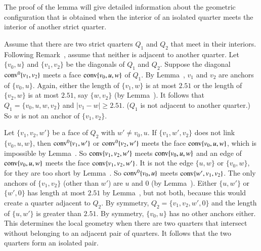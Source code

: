 \begin{tarskidata}
\begin{tarski}
The proof of the lemma will give detailed information about the
geometric configuration that is obtained when the interior of an
isolated quarter meets the interior of another strict quarter.

\begin{proved}  Assume that there are two strict quarters $Q_1$ and $Q_2$
that meet in their interiors.  Following Remark~,
assume that neither is adjacent to another quarter. Let $\{v_0,u\}$
and $\{v_1,v_2\}$ be the diagonals of $Q_1$ and $Q_2$. Suppose the
diagonal ${\operatorname{conv}}^0\{v_1,v_2\}$ meets a face ${\operatorname{conv}}\{v_0,u,w\}$ of $Q_1$.
By Lemma~, $v_1$ and $v_2$ are anchors of
$\{v_0,u\}$. Again, either the length of $\{v_1,w\}$ is at most
$2.51$ or the length of $\{v_2,w\}$ is at most $2.51$, say
$\{w,v_2\}$ (by Lemma~). It follows
that
    $Q_1=\{v_0,u,w,v_2\}$ and $|v_1-w|\ge2.51$.
($Q_1$ is not adjacent to another quarter.)  So $w$ is not an
anchor of $\{v_1,v_2\}$.

Let $\{v_1,v_2,w'\}$ be a face of $Q_2$ with $w'\ne v_0,u$. If
$\{v_1,w',v_2\}$ does not link $\{v_0,u,w\}$, then ${\operatorname{conv}}^0\{v_1,w'\}$ or
${\operatorname{conv}}^0\{v_2,w'\}$ meets the face ${\operatorname{conv}}\{v_0,u,w\}$, which is
impossible by Lemma~. So
${\operatorname{conv}}\{v_1,v_2,w'\}$  meets ${\operatorname{conv}}\{v_0,u,w\}$
and an edge of ${\operatorname{conv}}\{v_0,u,w\}$
meets the face ${\operatorname{conv}}\{v_1,v_2,w'\}$. It is not the edge
$\{u,w\}$ or $\{v_0,w\}$, for they are too short by
Lemma~.  So ${\operatorname{conv}}^0\{v_0,u\}$ meets 
${\operatorname{conv}}\{w',v_1,v_2\}$. The only anchors of $\{v_1,v_2\}$ (other
than $w'$) are $u$ and $0$ (by Lemma~).
Either $\{u,w'\}$ or $\{w',0\}$ has length at most $2.51$ by
Lemma~, but not both, because this
would create a quarter adjacent to $Q_2$. By symmetry,
$Q_2=\{v_1,v_2,w',0\}$ and the length of $\{u,w'\}$ is greater
than $2.51$. By symmetry, $\{v_0,u\}$ has no other anchors either.
This determines the local geometry when there are two quarters
that intersect without belonging to an adjacent pair of quarters.
It follows that the two quarters form an isolated pair.
\swallowed\end{proved}



\end{tarski}
\end{tarskidata}
